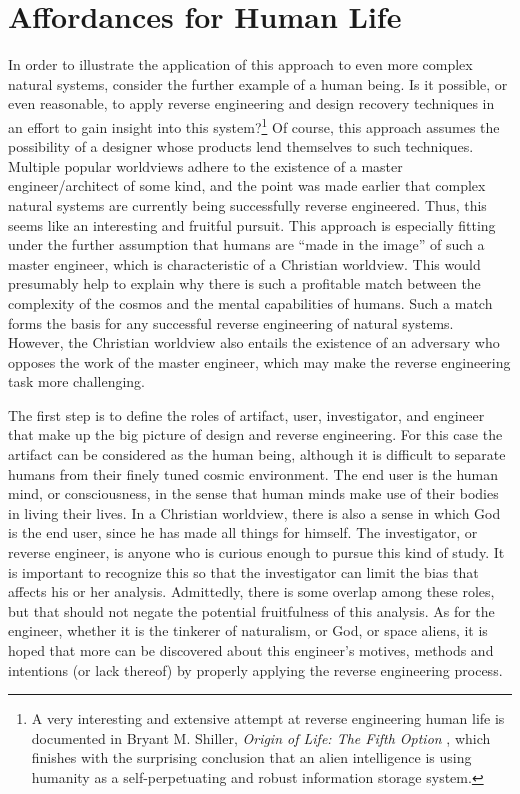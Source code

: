 
\section{Affordances for Human Life}

In order to illustrate the application of this approach to even more
complex natural systems, consider the further example of a human being.
Is it possible, or even reasonable, to apply reverse engineering and
design recovery techniques in an effort to gain insight into this
system?\footnote{%
A very interesting and extensive attempt at reverse
engineering human life is documented in Bryant M. Shiller,
\textit{Origin of Life: The Fifth Option} \citep{shiller2004},
which finishes with the surprising conclusion that an alien
intelligence is using humanity as a self-perpetuating and robust
information storage system.
} Of course, this approach assumes the
possibility of a designer whose products lend themselves to such
techniques. Multiple popular worldviews adhere to the existence of a
master engineer/architect of some kind, and the point was made earlier
that complex natural systems are currently being successfully reverse
engineered. Thus, this seems like an interesting and fruitful pursuit.
This approach is especially fitting under the further assumption that
humans are “made in the image” of such a master engineer, which is
characteristic of a Christian worldview. This would presumably help to
explain why there is such a profitable match between the complexity of
the cosmos and the mental capabilities of humans. Such a
match forms the basis for any successful reverse engineering of natural
systems. However, the Christian worldview also entails the existence of
an adversary who opposes the work of the master engineer, which may
make the reverse engineering task more challenging.

The first step is to define the roles of artifact, user, investigator,
and engineer that make up the big picture of design and reverse
engineering. For this case the artifact can be considered as the human
being, although it is difficult to separate humans from their finely
tuned cosmic environment. The end user is the human mind, or
consciousness, in the sense that human minds make use of their
bodies in living their lives. In a Christian worldview, there is also a
sense in which God is the end user, since he has made all things for
himself. The investigator, or reverse engineer, is anyone who is
curious enough to pursue this kind of study. It is important to
recognize this so that the investigator can limit the
bias that affects his or her analysis. Admittedly, there is some overlap among
these roles, but that should not negate the potential fruitfulness of
this analysis. As for the engineer, whether it is the tinkerer of
naturalism, or God, or space aliens, it is hoped that more can be
discovered about this engineer’s motives, methods and intentions (or
lack thereof) by properly applying the reverse engineering process. 

